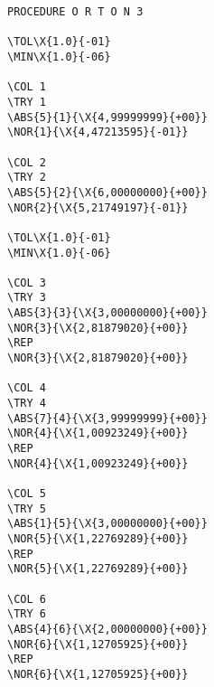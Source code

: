

\small%
\begin{Verbatim}[commandchars=\\\{\},codes={\catcode`$=3\catcode`_=8}]
PROCEDURE O R T O N 3

\TOL\X{1.0}{-01}
\MIN\X{1.0}{-06}

\COL 1
\TRY 1
\ABS{5}{1}{\X{4,99999999}{+00}}
\NOR{1}{\X{4,47213595}{-01}}

\COL 2
\TRY 2
\ABS{5}{2}{\X{6,00000000}{+00}}
\NOR{2}{\X{5,21749197}{-01}}

\TOL\X{1.0}{-01}
\MIN\X{1.0}{-06}

\COL 3
\TRY 3
\ABS{3}{3}{\X{3,00000000}{+00}}
\NOR{3}{\X{2,81879020}{+00}}
\REP
\NOR{3}{\X{2,81879020}{+00}}

\COL 4
\TRY 4
\ABS{7}{4}{\X{3,99999999}{+00}}
\NOR{4}{\X{1,00923249}{+00}}
\REP
\NOR{4}{\X{1,00923249}{+00}}

\COL 5
\TRY 5
\ABS{1}{5}{\X{3,00000000}{+00}}
\NOR{5}{\X{1,22769289}{+00}}
\REP
\NOR{5}{\X{1,22769289}{+00}}

\COL 6
\TRY 6
\ABS{4}{6}{\X{2,00000000}{+00}}
\NOR{6}{\X{1,12705925}{+00}}
\REP
\NOR{6}{\X{1,12705925}{+00}}
\end{Verbatim}
%

